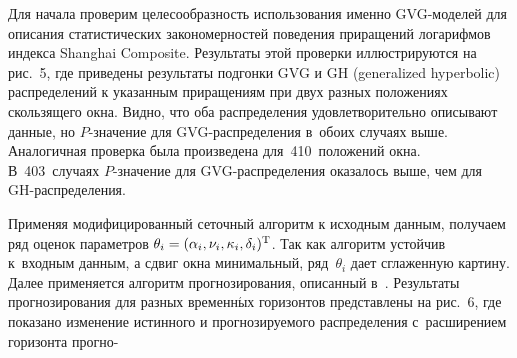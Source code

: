 \begin{multicols}{2}
Для начала проверим целесообразность использования именно
GVG-моделей для описания статистических закономерностей поведения
при\-ра\-щений логарифмов индекса Shanghai Composite. Результаты этой
проверки иллюстрируются на рис.~5, где приведены результаты подгонки
GVG и GH (generalized hyperbolic) рас\-пре\-де\-ле\-ний к указанным приращениям при двух разных
положениях скользящего окна. Видно, что оба распределения
удовлетворительно описывают данные, но $P$-зна\-че\-ние для
GVG-рас\-пре\-де\-ле\-ния в~обоих случаях выше.
Аналогичная проверка была произведена для~410~положений окна. 
В~403~случаях $P$-зна\-че\-ние для GVG-рас\-пре\-де\-ле\-ния оказалось выше, чем для
GH-рас\-пре\-де\-ления.





Применяя модифицированный сеточный алгоритм к исходным данным,
получаем ряд оценок параметров $\theta_i \hm=
(\alpha_i,\nu_i,\kappa_i,\delta_i)^{\mathrm{T}}$. Так как алгоритм устойчив 
к~входным данным, а сдвиг окна минимальный, ряд~$\theta_i$ дает
сглаженную картину. Далее применяется алгоритм прогнозирования,
описанный в~\cite{KorolevKorchagin2015}. Результаты прогнозирования
для разных временн$\acute{\mbox{ы}}$х горизонтов представлены на рис.~6, где
показано изменение истинного и прогнозируемого распределения 
с~расширением горизонта прогно-\linebreak\vspace*{-12pt}

\pagebreak

\end{multicols}

\begin{figure} %
\vspace*{1pt}
 \begin{center}
 \mbox{%
 \epsfxsize=161.931mm
 }
 \end{center}
 \vspace*{-11pt}
\label{T+120}
\end{figure}

